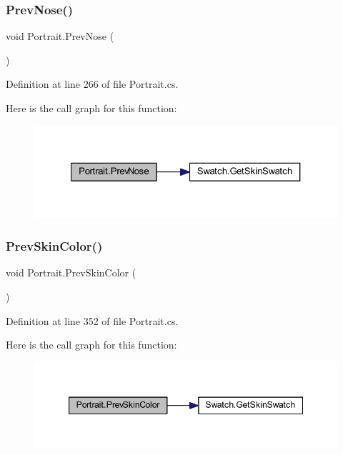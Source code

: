 \subsubsection{\texorpdfstring{PrevNose()}{PrevNose()}}
{\footnotesize\ttfamily void Portrait.\+Prev\+Nose (\begin{DoxyParamCaption}{ }\end{DoxyParamCaption})}



Definition at line 266 of file Portrait.\+cs.

Here is the call graph for this function\+:
\nopagebreak
\begin{figure}[H]
\begin{center}
\leavevmode
\includegraphics[width=327pt]{class_portrait_afc5cd84e6086e462adb30f0d988c76b6_cgraph}
\end{center}
\end{figure}
\mbox{\label{class_portrait_acbaf5360b4efe38e96ae08816ee94ccb}} 
\subsubsection{\texorpdfstring{PrevSkinColor()}{PrevSkinColor()}}
{\footnotesize\ttfamily void Portrait.\+Prev\+Skin\+Color (\begin{DoxyParamCaption}{ }\end{DoxyParamCaption})}



Definition at line 352 of file Portrait.\+cs.

Here is the call graph for this function\+:
\nopagebreak
\begin{figure}[H]
\begin{center}
\leavevmode
\includegraphics[width=347pt]{class_portrait_acbaf5360b4efe38e96ae08816ee94ccb_cgraph}
\end{center}
\end{figure}
\mbox{\label{class_portrait_ab8365d52d39bacdb043a5f707e9c17ef}} 
